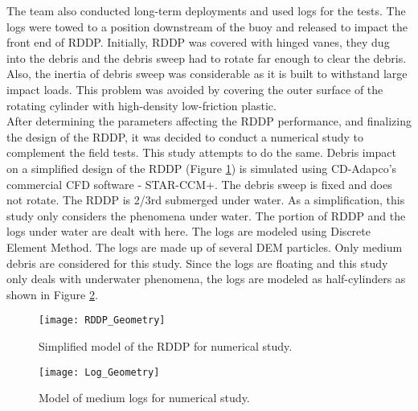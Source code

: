 The team also conducted long-term deployments and used logs for the tests. The logs were towed to a position downstream of the buoy and released to impact the front end of RDDP. Initially, RDDP was covered with hinged vanes, they dug into the debris and the debris sweep had to rotate far enough to clear the debris. Also, the inertia of debris sweep was considerable as it is built to withstand large impact loads. This problem was avoided by covering the outer surface of the rotating cylinder with high-density low-friction plastic.\\
After determining the parameters affecting the RDDP performance, and finalizing the design of the RDDP, it was decided to conduct a numerical study to complement the field tests. This study attempts to do the same. Debris impact on a simplified design of the RDDP (Figure \ref{fig:RDDP_Geometry}) is simulated using CD-Adapco's commercial CFD software - STAR-CCM+. The debris sweep is fixed and does not rotate. The RDDP is 2/3rd submerged under water. As a simplification, this study only considers the phenomena under water.  The portion of RDDP and the logs under water are dealt with here. The logs are modeled using Discrete Element Method. The logs are made up of several DEM particles. Only medium debris are considered for this study. Since the logs are floating and this study only deals with underwater phenomena, the logs are modeled as half-cylinders as shown in Figure \ref{fig:Log_Geometry}.
\begin{figure}[H]
\centering
\texttt{[image: RDDP\_Geometry]}
\caption{\label{fig:RDDP_Geometry}Simplified model of the RDDP for numerical study.}
\end{figure}
\begin{figure}[H]
\centering
\texttt{[image: Log\_Geometry]}
\caption{\label{fig:Log_Geometry}Model of medium logs for numerical study.}
\end{figure}













